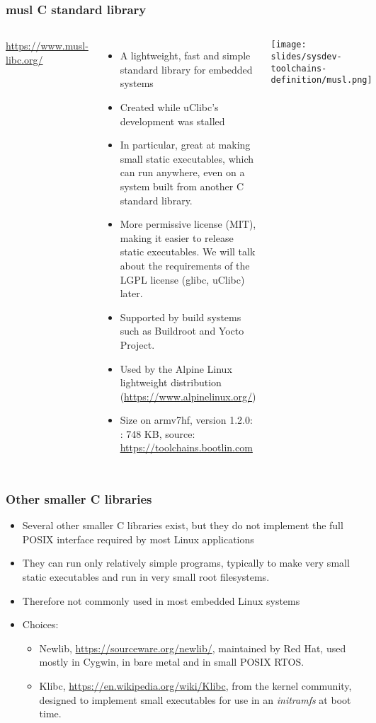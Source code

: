 \begin{frame}
  \frametitle{musl C standard library}
  \begin{columns}[T]
      \url{https://www.musl-libc.org/}
      \begin{itemize}
      \item A lightweight, fast and simple standard library for embedded systems
      \item Created while uClibc's development was stalled
      \item In particular, great at making small static executables,
	    which can run anywhere, even on a system built
            from another C standard library.
      \item More permissive license (MIT), making it easier to release
            static executables. We will talk about the requirements
            of the LGPL license (glibc, uClibc) later.
      \item Supported by build systems such as Buildroot and Yocto
        Project.
      \item Used by the Alpine Linux lightweight distribution
        (\url{https://www.alpinelinux.org/})
      \item Size on armv7hf, version 1.2.0:
        : 748 KB, source: \url{https://toolchains.bootlin.com}
      \end{itemize}
    \texttt{[image: slides/sysdev-toolchains-definition/musl.png]}
  \end{columns}
\end{frame}

\begin{frame}
  \frametitle{Other smaller C libraries}
  \begin{itemize}
  \item Several other smaller C libraries exist, but they do not
    implement the full POSIX interface required by most Linux
    applications
  \item They can run only relatively simple programs, typically to
    make very small static executables and run in very small root
    filesystems.
  \item Therefore not commonly used in most embedded Linux systems
  \item Choices:
    \begin{itemize}
    \item Newlib, \url{https://sourceware.org/newlib/}, maintained by
      Red Hat, used mostly in Cygwin, in bare metal and in small POSIX
      RTOS.
    \item Klibc, \url{https://en.wikipedia.org/wiki/Klibc}, from the
      kernel community, designed to implement small executables for
      use in an {\em initramfs} at boot time.
    \end{itemize}
  \end{itemize}
\end{frame}

